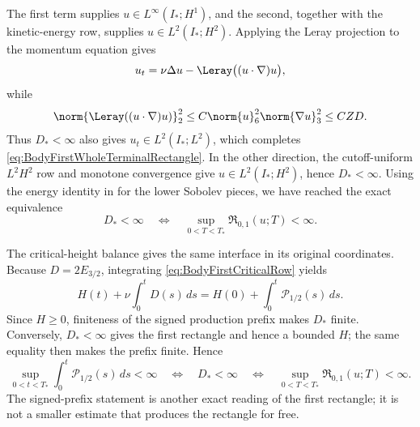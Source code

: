 The first term supplies \(u\in L^\infty(I_*;H^1)\), and the second, together
with the kinetic-energy row, supplies \(u\in L^2(I_*;H^2)\).  Applying the
Leray projection to the momentum equation gives
\[
  u_t=\nu\Delta u-\Leray\bigl((u\cdot\nabla)u\bigr),
\]
while
\begin{equation}\label{eq:BodyNonlinearityFromCriticalDissipation}
  \norm{\Leray((u\cdot\nabla)u)}_2^2
  \leq C\norm{u}_6^2\norm{\nabla u}_3^2
  \leq C ZD.
\end{equation}
Thus \(D_*<\infty\) also gives \(u_t\in L^2(I_*;L^2)\), which completes
\eqref{eq:BodyFirstWholeTerminalRectangle}.  In the other direction, the
cutoff-uniform \(L^2H^2\) row and monotone convergence give
\(u\in L^2(I_*;H^2)\), hence \(D_*<\infty\).  Using the energy identity in
 for the lower
Sobolev pieces, we have reached the exact equivalence
\begin{equation}\label{eq:BodyFirstRectangleCriticalDissipationEquivalence}
  D_*<\infty
  \quad\Longleftrightarrow\quad
  \sup_{0<T<T_*}\mathfrak R_{0,1}(u;T)<\infty.
\end{equation}

The critical-height balance gives the same interface in its original
coordinates.  Because \(D=2E_{3/2}\), integrating
\eqref{eq:BodyFirstCriticalRow} yields
\begin{equation}\label{eq:BodyCriticalPrefixIdentity}
  H(t)+\nu\int_0^tD(s)\,ds
  =H(0)+\int_0^t\mathcal P_{1/2}(s)\,ds.
\end{equation}
Since \(H\geq0\), finiteness of the signed production prefix makes \(D_*\)
finite.  Conversely, \(D_*<\infty\) gives the first rectangle and hence a
bounded \(H\); the same equality then makes the prefix finite.  Hence
\begin{equation}\label{eq:BodyFirstRectangleSignedPrefixEquivalence}
  \sup_{0<t<T_*}\int_0^t\mathcal P_{1/2}(s)\,ds<\infty
  \quad\Longleftrightarrow\quad
  D_*<\infty
  \quad\Longleftrightarrow\quad
  \sup_{0<T<T_*}\mathfrak R_{0,1}(u;T)<\infty.
\end{equation}
The signed-prefix statement is another exact reading of the first rectangle;
it is not a smaller estimate that produces the rectangle for free.

